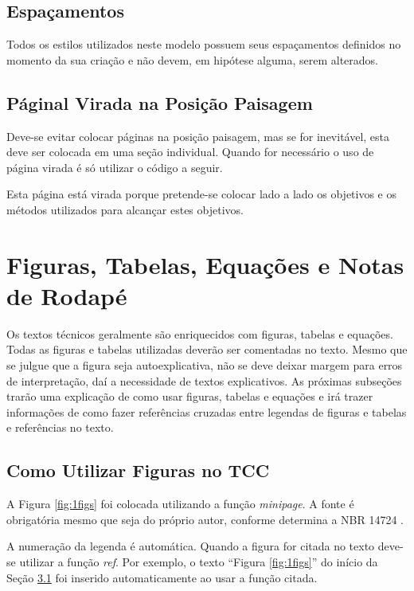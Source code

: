 \documentclass[
        oneside,      %
        english,			
        brazil			 
        ]{configcefetmglpd}
\begin{document}
\section{Espaçamentos}
Todos os estilos utilizados neste modelo possuem seus espaçamentos definidos no momento da sua criação e não devem, em hipótese alguma, serem alterados.

\section{Páginal Virada na Posição Paisagem} 
Deve-se evitar colocar páginas na posição paisagem, mas se for inevitável, esta deve ser colocada em uma seção individual. Quando for necessário o uso de página virada é só utilizar o código a seguir.

\begin{landscape}
Esta página está virada porque pretende-se colocar lado a lado os objetivos e os métodos utilizados para alcançar estes objetivos.
\end{landscape}

\chapter{Figuras, Tabelas, Equações e Notas de Rodapé} \label{cap:fig_tab_eq}
Os textos técnicos geralmente são enriquecidos com figuras, tabelas e equações. Todas as figuras e tabelas utilizadas deverão ser comentadas no texto. Mesmo que se julgue que a figura seja autoexplicativa, não se deve deixar margem para erros de interpretação, daí a necessidade de textos explicativos. As próximas subseções trarão uma explicação de como usar figuras, tabelas e equações e irá trazer informações de como fazer referências cruzadas entre legendas de figuras e tabelas e referências no texto.

\section{Como Utilizar Figuras no TCC} \label{sec:figuras_tcc}
A Figura \ref{fig:1figs} foi colocada utilizando a função \textit{minipage}. A fonte é obrigatória mesmo que seja do próprio autor, conforme determina a NBR 14724 \cite{bib:abnt14724}.

A numeração da legenda é automática. Quando a figura for citada no texto deve-se utilizar a função \textit{ref}. Por exemplo, o texto “Figura \ref{fig:1figs}” do início da Seção \ref{sec:figuras_tcc} foi inserido automaticamente ao usar a função citada.
\end{document}
